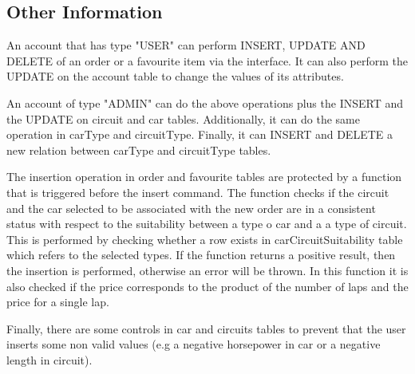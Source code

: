 \subsection{Other Information}

An account that has type "USER" can perform INSERT, UPDATE AND DELETE of an order or a favourite item via the interface. It can also perform the UPDATE on the account table to change the values of its attributes.

An account of type "ADMIN" can do the above operations plus the INSERT and the UPDATE on circuit and car tables. Additionally, it can do the same operation in carType and circuitType. Finally, it can INSERT and DELETE a new relation between carType and circuitType tables.

The insertion operation in order and favourite tables are protected by a function that is triggered before the insert command. The function checks if the circuit and the car selected to be associated with the new order are in a consistent status with respect to the suitability between a type o car and a a type of circuit. This is performed by checking whether a row exists in carCircuitSuitability table which refers to the selected types. If the function returns a positive result, then the insertion is performed, otherwise an error will be thrown. In this function it is also checked if the price corresponds to the product of the number of laps and the price for a single lap.

Finally, there are some controls in car and circuits tables to prevent that the user inserts some non valid values (e.g a negative horsepower in car or a negative length in circuit).